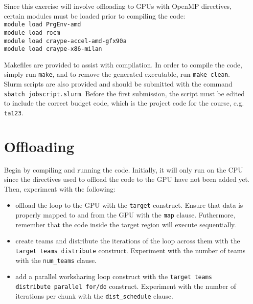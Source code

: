 \documentclass{article}
\begin{document}
\noindent Since this exercise will involve offloading to GPUs with OpenMP directives, certain modules must be loaded prior to compiling the code: \\

\texttt{module load PrgEnv-amd} \\
\indent \texttt{module load rocm} \\
\indent \texttt{module load craype-accel-amd-gfx90a} \\
\indent \texttt{module load craype-x86-milan} 

\noindent Makefiles are provided to assist with compilation. In order to compile the code, simply run \texttt{make}, and to remove the generated executable, run \texttt{make clean}. \\

\noindent Slurm scripts are also provided and should be submitted with the command \texttt{sbatch jobscript.slurm}. Before the first submission, the script must be edited to include the correct budget code, which is the project code for the course, e.g. \texttt{ta123}. 


\section{Offloading}

Begin by compiling and running the code. Initially, it will only run on the CPU since the directives used to offload the code to the GPU have not been added yet. \\

\noindent Then, experiment with the following:



\begin{itemize}
    \item offload the loop to the GPU with the \texttt{target} construct. Ensure that data is properly mapped to and from the GPU with the \texttt{map} clause. Futhermore, remember that the code inside the target region will execute sequentially.
    \item create teams and distribute the iterations of the loop across them with the \texttt{target teams distribute} construct. Experiment with the number of teams with the \texttt{num\_teams} clause.
    \item add a parallel worksharing loop construct with the \texttt{target teams distribute parallel for/do} construct. Experiment with the number of iterations per chunk with the \texttt{dist\_schedule} clause.
\end{itemize}
\end{document}
